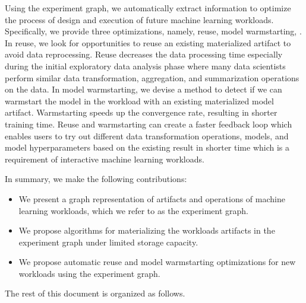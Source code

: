 Using the experiment graph, we automatically extract information to optimize the process of design and execution of future machine learning workloads.
Specifically, we provide three optimizations, namely, reuse, model warmstarting, .
In reuse, we look for opportunities to reuse an existing materialized artifact to avoid data reprocessing.
Reuse decreases the data processing time especially during the initial exploratory data analysis phase where many data scientists perform similar data transformation, aggregation, and summarization operations on the data.
In model warmstarting, we devise a method to detect if we can warmstart the model in the workload with an existing materialized model artifact.
Warmstarting speeds up the convergence rate, resulting in shorter training time.  %
Reuse and warmstarting can create a faster feedback loop which enables users to try out different data transformation operations, models, and model hyperparameters based on the existing result in shorter time which is a requirement of interactive machine learning workloads.

In summary, we make the following contributions:
\begin{itemize}
\item We present a graph representation of artifacts and operations of machine learning workloads, which we refer to as the experiment graph.
\item We propose algorithms for materializing the workloads artifacts in the experiment graph under limited storage capacity.
\item We propose automatic reuse and model warmstarting optimizations for new workloads using the experiment graph.
\end{itemize}

The rest of this document is organized as follows.